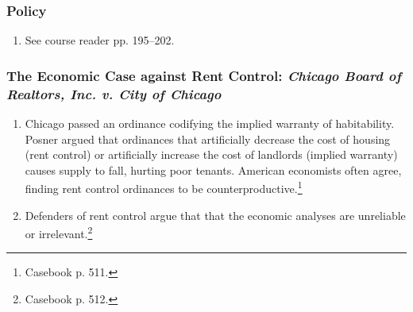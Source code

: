 \subsubsection{Policy}

\begin{enumerate}
    \item See course reader pp. 195--202.
\end{enumerate}

\subsubsection{The Economic Case against Rent Control: \emph{Chicago Board of 
Realtors, Inc. v. City of Chicago}}

\begin{enumerate}
    \item Chicago passed an ordinance codifying the implied warranty of 
    habitability. Posner argued that ordinances that artificially decrease the 
    cost of housing (rent control) or artificially increase the 
    cost of landlords (implied warranty) causes supply to fall, hurting poor 
    tenants. American economists often agree, finding rent control ordinances 
    to be counterproductive.\footnote{Casebook p. 511.}
    \item Defenders of rent control argue that that the economic analyses are 
    unreliable or irrelevant.\footnote{Casebook p. 512.}
\end{enumerate}
